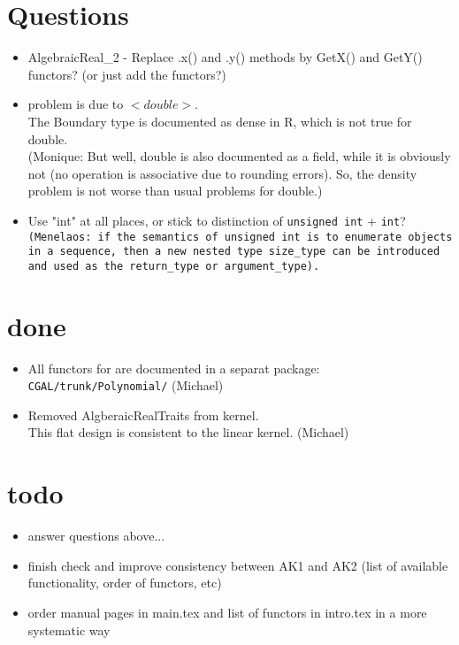 \section{Questions}
\begin{itemize}
\item AlgebraicReal\_2 - Replace .x() and .y() methods by GetX() and 
	GetY() functors? (or just add the functors?)
\item problem is due to $<double>$.\\
    The Boundary type is documented as dense in R, which is not true
    for double.\\ (Monique: But well, double is also documented as a
    field, while it is obviously not (no operation is associative
    due to rounding errors). So, the density problem is not worse
    than usual problems for double.)
\item Use "int" at all places, or stick to distinction of \texttt{unsigned
   int} + \texttt{int}?\\
   \texttt{(Menelaos: if the semantics of \texttt{unsigned int} is to enumerate
   objects in a sequence, then a new nested type \texttt{size\_type}
   can be introduced and used as the \texttt{return\_type} or
   \texttt{argument\_type}).}
\end{itemize}

\section{done} 
\begin{itemize}
\item 
All functors for  are documented in a separat
 package:\\
{\tt CGAL/trunk/Polynomial/} (Michael)
\item 
Removed AlgberaicRealTraits from kernel. \\
This flat design is consistent to the linear kernel. (Michael)
\end{itemize}

\section{todo} 
\begin{itemize}
\item {} answer questions above...
\item {} finish check and improve consistency between AK1 and AK2 
(list of available functionality, order of functors, etc)
\item {} order manual pages in main.tex and list of functors in intro.tex in a more systematic way
\end{itemize} 

